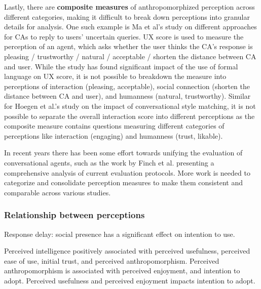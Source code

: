 \documentclass[sigconf,screen,review, anonymous]{acmart}
\newcommand{\cmt}[1]{}%
\begin{document}
Lastly, there are \textbf{composite measures} of anthropomorphized perception across different categories, making it difficult to break down perceptions into granular details for analysis. One such example is Ma et al's study \cite{ma2022ask}\cmt{[29]} on different approaches for CAs to reply to users' uncertain queries. UX score is used to measure the perception of an agent, which asks whether the user thinks the CA's response is pleasing / trustworthy / natural / acceptable / shorten the distance between CA and user. While the study has found significant impact of the use of formal language on UX score, it is not possible to breakdown the measure into perceptions of interaction (pleasing, acceptable), social connection (shorten the distance between CA and user), and humanness (natural, trustworthy). Similar for Hoegen et al.'s study \cite{hoegen2019end}\cmt{[31]} on the impact of conversational style matching, it is not possible to separate the overall interaction score into different perceptions as the composite measure contains questions measuring different categories of perceptions like interaction (engaging) and humanness (trust, likable).

In recent years there has been some effort towards unifying the evaluation of conversational agents, such as the work by Finch et al. \cite{finch2020towards} presenting a comprehensive analysis of current evaluation protocols. More work is needed to categorize and consolidate perception measures to make them consistent and comparable across various studies. 


\subsubsection{Relationship between perceptions}

Response delay: social presence has a significant effect on intention to use. 
\cite{gnewuch2022opposing}\cmt{[20]}

Perceived intelligence positively associated with perceived usefulness, perceived ease of use, initial trust, and perceived anthropomorphism. Perceived anthropomorphism is associated with perceived enjoyment, and intention to adopt. Perceived usefulness and perceived enjoyment impacts intention to adopt. \cite{moussawi2021perceptions}\cmt{[36]}
\end{document}
